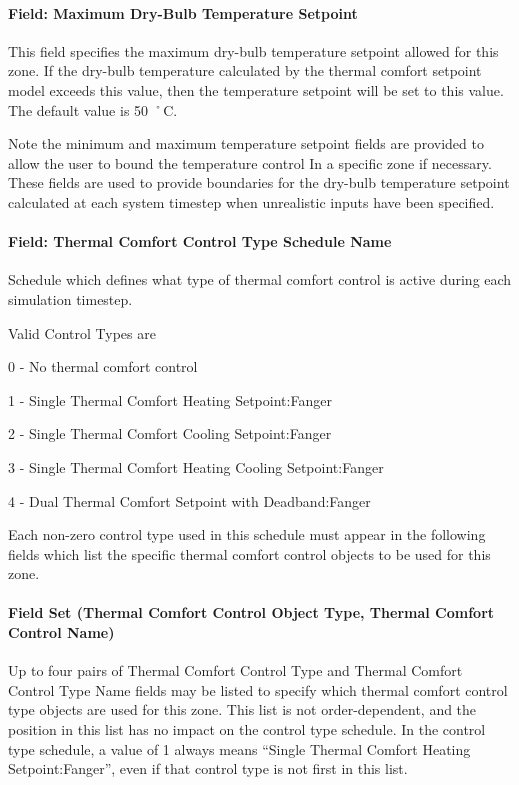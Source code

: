 \paragraph{Field: Maximum Dry-Bulb Temperature Setpoint}\label{field-maximum-dry-bulb-temperature-setpoint}

This field specifies the maximum dry-bulb temperature setpoint allowed for this zone. If the dry-bulb temperature calculated by the thermal comfort setpoint model exceeds this value, then the temperature setpoint will be set to this value. The default value is 50 ˚C.

Note the minimum and maximum temperature setpoint fields are provided to allow the user to bound the temperature control In a specific zone if necessary. These fields are used to provide boundaries for the dry-bulb temperature setpoint calculated at each system timestep when unrealistic inputs have been specified.

\paragraph{Field: Thermal Comfort Control Type Schedule Name}\label{field-thermal-comfort-control-type-schedule-name}

Schedule which defines what type of thermal comfort control is active during each simulation timestep.

Valid Control Types are

0 - No thermal comfort control

1 - Single Thermal Comfort Heating Setpoint:Fanger

2 - Single Thermal Comfort Cooling Setpoint:Fanger

3 - Single Thermal Comfort Heating Cooling Setpoint:Fanger

4 - Dual Thermal Comfort Setpoint with Deadband:Fanger

Each non-zero control type used in this schedule must appear in the following fields which list the specific thermal comfort control objects to be used for this zone.

\paragraph{Field Set (Thermal Comfort Control Object Type, Thermal Comfort Control Name)}\label{field-set-thermal-comfort-control-object-type-thermal-comfort-control-name}

Up to four pairs of Thermal Comfort Control Type and Thermal Comfort Control Type Name fields may be listed to specify which thermal comfort control type objects are used for this zone. This list is not order-dependent, and the position in this list has no impact on the control type schedule. In the control type schedule, a value of 1 always means ``Single Thermal Comfort Heating Setpoint:Fanger'', even if that control type is not first in this list.

